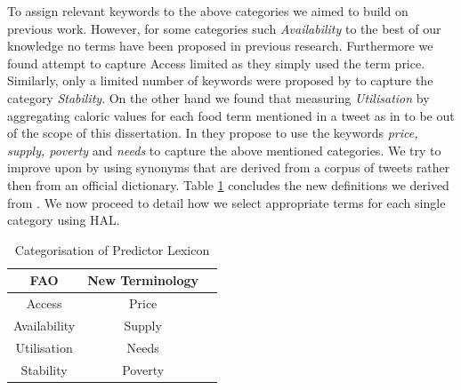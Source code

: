 To assign relevant keywords to the above categories we aimed to build on previous work. However, for some categories such \emph{Availability} to the best of our knowledge no terms have been proposed in previous research. Furthermore we found \cite{ungp2013} attempt to capture Access limited as they simply used the term price. Similarly, only a limited number of keywords were proposed by \cite{RePEc} to capture the category \emph{Stability}.  On the other hand we found that measuring \emph{Utilisation} by aggregating caloric values for each food term mentioned in a tweet as in \cite{AbbarMW14} to be out of the scope of this dissertation. In \cite{hum14} they  propose to use the keywords \emph{price, supply, poverty} and \emph{needs} to capture the above mentioned categories. We try to improve upon \cite{hum14}  by using synonyms that are derived from a corpus of tweets rather then from an official dictionary. Table \ref{tab:Def} concludes the new definitions we derived from \cite{hum14}. We now proceed to detail how we select appropriate terms for each single category using HAL. 

\begin{table}[H]
\centering
\begin{tabular}{ |c|c|c| } 

 FAO  &  New Terminology \\ 
  \hline
 Access & Price  \\ 
 Availability & Supply  \\ 
 Utilisation & Needs\\ 
 Stability& Poverty \\
 

\end{tabular}
\caption{Categorisation of Predictor Lexicon}
\label{tab:Def}
\end{table}






